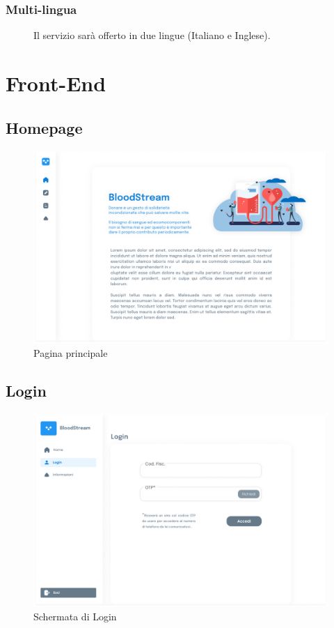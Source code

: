 \documentclass{article}
\begin{document}
\subsubsection{Multi-lingua} \label{rnf_8}
\begin{description}
    \item[] Il servizio sarà offerto in due lingue (Italiano e Inglese).
\end{description}

\clearpage
\section{Front-End}

\subsection{Homepage}
\begin{figure}[htp]
\centering
\includegraphics[width=\textwidth,height=\textheight,keepaspectratio]{media/bloodUI-1.png}
\caption{Pagina principale}
\end{figure}

\FloatBarrier

\clearpage
\subsection{Login}
\begin{figure}[htp]
\centering
\includegraphics[width=\textwidth,height=\textheight,keepaspectratio]{media/bloodUI-4.png}
\caption{Schermata di Login}
\end{figure}
\end{document}
